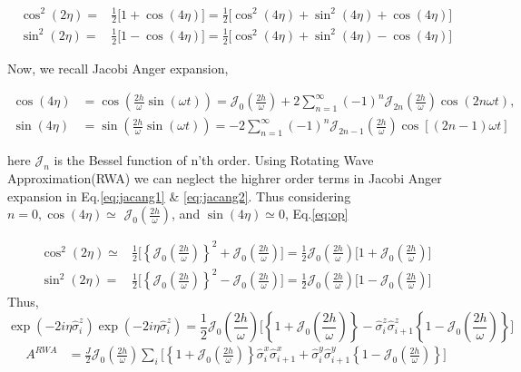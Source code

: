 \documentclass[aps,prb,reprint,showpacs,floatfix,superscriptaddress, onecolumn, nofootinbib, 9pt]{revtex4-2}
\begin{document}
\begin{enumerate}
{\begin{align}
	\cos^2(2\eta) =& \frac12\big[1+\cos(4\eta)\big]=\frac12\big[\cos^2(4\eta)+ \sin^2(4\eta)+\cos(4\eta)\big]\nonumber\\
	\sin^2(2\eta) =& \frac12\big[1-\cos(4\eta)\big]=\frac12\big[\cos^2(4\eta)+ \sin^2(4\eta)-\cos(4\eta)\big]
	\label{eq:cossin}
\end{align}

Now, we recall Jacobi Anger expansion,


\begin{align}
	\cos (4 \eta)&=\cos \left(\frac{2 h}{\omega} \sin (\omega t)\right)=\mathcal{J}_{0}\left(\frac{2 h}{\omega}\right)+2 \sum_{n=1}^{\infty}(-1)^{n} \mathcal{J}_{2 n}\left(\frac{2 h}{\omega}\right) \cos (2 n \omega t),\label{eq:jacang1} \\
	\sin (4 \eta)&=\sin \left(\frac{2 h}{\omega} \sin (\omega t)\right)=-2 \sum_{n=1}^{\infty}(-1)^{n} \mathcal{J}_{2 n-1}\left(\frac{2 h}{\omega}\right) \cos [(2 n-1) \omega t]
	\label{eq:jacang2}
\end{align}


here $\mathcal{J}_{n}$ is the Bessel function of n'th order. Using Rotating Wave Approximation(RWA) we can neglect the highrer order terms in Jacobi Anger expansion in Eq.\eqref{eq:jacang1} \& \eqref{eq:jacang2}. Thus considering $n=0, \cos (4 \eta) \simeq$ $\mathcal{J}_{0}\left(\frac{2 h}{\omega}\right)$, and $\sin (4 \eta) \simeq 0$, Eq.\eqref{eq:op}

\begin{align}
	\cos^2(2\eta) \simeq& \frac12\Bigg[\left\{\mathcal{J}_0\left(\frac{2h}{\omega}\right)\right\}^2 + \mathcal{J}_0\left(\frac{2h}{\omega}\right)\Bigg]=\frac12 \mathcal{J}_0\left(\frac{2h}{\omega}\right)\Bigg[1+ \mathcal{J}_0\left(\frac{2h}{\omega}\right)\Bigg]\nonumber\\
	\sin^2(2\eta) =& \frac12\Bigg[\left\{\mathcal{J}_0\left(\frac{2h}{\omega}\right)\right\}^2 - \mathcal{J}_0\left(\frac{2h}{\omega}\right)\Bigg]=\frac12 \mathcal{J}_0\left(\frac{2h}{\omega}\right)\Bigg[1- \mathcal{J}_0\left(\frac{2h}{\omega}\right)\Bigg]
	\label{eq:cossin}
\end{align}
Thus,
\begin{equation}
	\exp\left(-2i\eta\hat{\sigma}^z_i\right)\exp\left(-2i\eta\hat{\sigma}^z_i\right) = \frac12 \mathcal{J}_0\left(\frac{2h}{\omega}\right)\Bigg[\left\{1+ \mathcal{J}_0\left(\frac{2h}{\omega}\right)\right\} - \hat{\sigma}^z_i\hat{\sigma}^z_{i+1}\left\{1- \mathcal{J}_0\left(\frac{2h}{\omega}\right)\right\} \Bigg]
\end{equation}
\begin{align}
	A^{R W A}&=\frac{J}{2} \mathcal{J}_0\left(\frac{2h}{\omega}\right)\sum_{i}\Bigg[\left\{1+ \mathcal{J}_0\left(\frac{2h}{\omega}\right)\right\} \hat{\sigma}_{i}^{x} \hat{\sigma}_{i+1}^{x} + \hat{\sigma}^y_i\hat{\sigma}^y_{i+1}\left\{1- \mathcal{J}_0\left(\frac{2h}{\omega}\right)\right\} \Bigg]
	\label{eq:hrwa1}
\end{align}

}
\end{enumerate}
\end{document}
